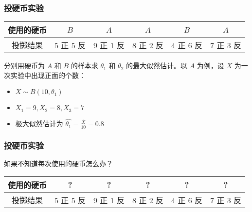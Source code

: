 \documentclass{beamer}
\newcommand{\Gh}{\theta}
\begin{document}
\begin{frame}
    \frametitle{投硬币实验}

    \begin{table}
        \begin{tabular}{c|c|c|c|c|c}
            使用的硬币 & $B$ & $A$ & $A$ & $B$ & $A$ \\\hline
            投掷结果 & $5$ 正 $5$ 反 & $9$ 正 $1$ 反 & $8$ 正 $2$ 反 & $4$ 正 $6$ 反 & $7$ 正 $3$ 反
        \end{tabular}
    \end{table}

    \bigskip

    分别用硬币为 $A$ 和 $B$ 的样本求 $\Gh_1$ 和 $\Gh_2$ 的最大似然估计。以 $A$ 为例，设 $X$ 为一次实验中出现正面的个数：

    \begin{itemize}
        \item $X \sim B(10, \Gh_1)$
        \item $X_1 = 9, X_2 = 8, X_3 = 7$
        \item 极大似然估计为 $\hat{\Gh_1} = \frac{\overline{X}}{10} = 0.8$
    \end{itemize}

\end{frame}

\begin{frame}
    \frametitle{投硬币实验}

    如果不知道每次使用的硬币怎么办？

    \begin{table}
        \begin{tabular}{c|c|c|c|c|c}
            使用的硬币 & ? & ? & ? & ? & ? \\\hline
            投掷结果 & $5$ 正 $5$ 反 & $9$ 正 $1$ 反 & $8$ 正 $2$ 反 & $4$ 正 $6$ 反 & $7$ 正 $3$ 反
        \end{tabular}
    \end{table}

\end{frame}
\end{document}
